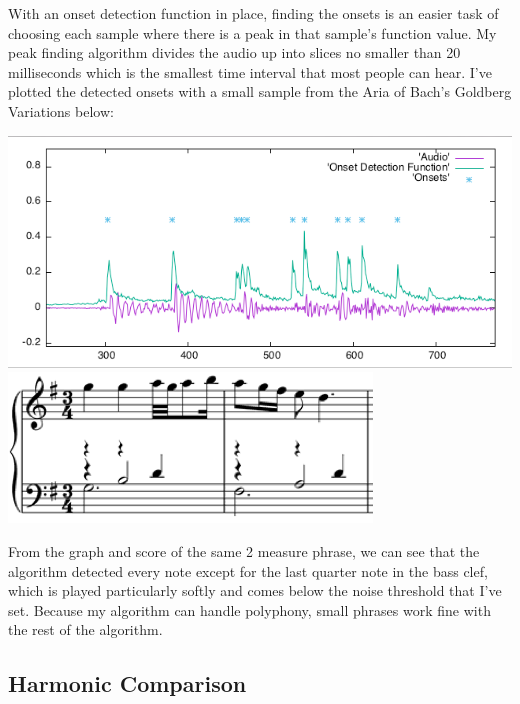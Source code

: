 \documentclass{amsart}
\theoremstyle{definition}
\begin{document}
With an onset detection function in place, finding the onsets is an easier task of choosing each sample where there is a peak in that sample's function value.
My peak finding algorithm divides the audio up into slices no smaller than 20 milliseconds 
which is the smallest time interval that most people can hear.
I've plotted the detected onsets with a small sample from the Aria of Bach's Goldberg Variations below:

{\centering
\begin{center}
  \includegraphics[scale = 0.3]{onsetPlot}
  \includegraphics[scale = 0.5]{sheetMusic}
\end{center}
}

From the graph and score of the same 2 measure phrase, we can see that the algorithm detected every note except for the last quarter note in the bass clef, which is played particularly softly and comes below the noise threshold that I've set.
Because my algorithm can handle polyphony, small phrases work fine with the rest of the algorithm.

\subsection{Harmonic Comparison}
\end{document}
